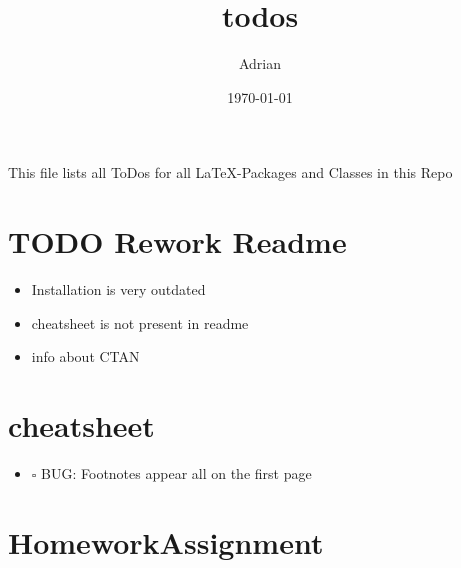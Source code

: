 \documentclass[11pt]{article}
\author{Adrian}
\date{\today}
\title{todos}
\begin{document}
\maketitle
\tableofcontents

This file lists all ToDos for all \LaTeX{}-Packages and Classes in this
 Repo

\section{{\bfseries\sffamily TODO} Rework Readme}
\label{sec-1}
\begin{itemize}
\item Installation is very outdated
\item cheatsheet is not present in readme
\item info about CTAN
\end{itemize}


\section{cheatsheet}
\label{sec-2}
\begin{itemize}
\item $\square$ BUG: Footnotes appear all on the first page
\end{itemize}


\section{HomeworkAssignment}
\label{sec-3}
\end{document}
